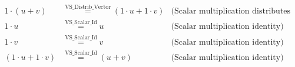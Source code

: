 \documentclass[12pt]{article}
\begin{document}
\usepackage{xcolor}
\begin{align*}
1 \cdot (u + v) &\overset{\text{VS\_Distrib\_Vector}}{=} (1 \cdot u + 1 \cdot v) & \text{(Scalar multiplication distributes over vector addition)} \\
1 \cdot u &\overset{\text{VS\_Scalar\_Id}}{=} u & \text{(Scalar multiplication identity)} \\
1 \cdot v &\overset{\text{VS\_Scalar\_Id}}{=} v & \text{(Scalar multiplication identity)} \\
(1 \cdot u + 1 \cdot v) &\overset{\text{VS\_Scalar\_Id}}{=} (u + v) & \text{(Scalar multiplication identity)} \\
\end{align*}
\end{document}
